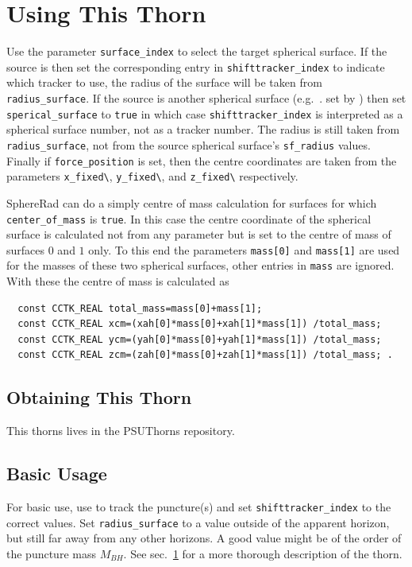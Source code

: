 \section{Using This Thorn}\label{sec:sphererad_usingthisthorn}
Use the parameter \verb|surface_index| to select the target spherical surface.
If the source is  then set the corresponding entry in
\verb|shifttracker_index| to indicate which tracker to use, the radius of the
surface will be taken from \verb|radius_surface|. If the source is another
spherical surface (e.g.\ . set by ) then set \verb|sperical_surface| to
\verb|true| in which case \verb|shifttracker_index| is interpreted as a
spherical surface number, not as a tracker number. The radius is still taken
from \verb|radius_surface|, not from the source spherical surface's
\verb|sf_radius| values. Finally if \verb|force_position| is set, then the
centre coordinates are taken from the parameters \verb|x_fixed\|,
\verb|y_fixed\|, and \verb|z_fixed\| respectively.

SphereRad can do a simply centre of mass calculation for surfaces for which
\verb|center_of_mass| is \verb|true|. In this case the centre coordinate of
the spherical surface is calculated not from any parameter but is set to the
centre of mass of surfaces $0$ and $1$ only. To this end the parameters
\verb|mass[0]| and \verb|mass[1]| are used for the masses of these two
spherical surfaces, other entries in \verb|mass| are ignored. With these the
centre of mass is calculated as
\begin{verbatim}
  const CCTK_REAL total_mass=mass[0]+mass[1];
  const CCTK_REAL xcm=(xah[0]*mass[0]+xah[1]*mass[1]) /total_mass;
  const CCTK_REAL ycm=(yah[0]*mass[0]+yah[1]*mass[1]) /total_mass;
  const CCTK_REAL zcm=(zah[0]*mass[0]+zah[1]*mass[1]) /total_mass; .
\end{verbatim}

\subsection{Obtaining This Thorn}
This thorns lives in the PSUThorns repository.

\subsection{Basic Usage}
For basic use, use  to track the puncture(s) and set
\verb|shifttracker_index| to the correct values. Set \verb|radius_surface| to
a value outside of the apparent horizon, but still far away from any other
horizons. A good value might be of the order of the puncture mass $M_{BH}$.
See sec.~\ref{sec:sphererad_usingthisthorn} for a more thorough description of
the thorn.

